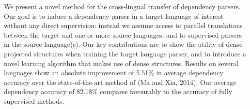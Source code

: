 We present a novel method for the cross-lingual transfer of dependency parsers. Our goal is to induce a dependency parser in a target language of interest without any direct supervision: instead we assume access to parallel translations between the target and one or more source languages, and to supervised parsers in the source language(s). Our key contributions are to show the utility of dense projected structures when training the target language parser, and to introduce a novel learning algorithm that makes use of dense structures. Results on several languages show an absolute improvement of 5.51\% in average dependency accuracy over the state-of-the-art method of (Ma and Xia, 2014). Our average dependency accuracy of 82.18\% compares favourably to the accuracy of fully supervised methods.
